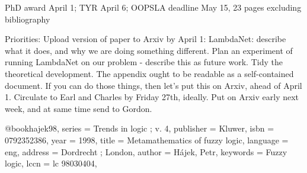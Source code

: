 PhD award April 1; TYR April 6; OOPSLA deadline May 15, 23 pages excluding bibliography


Priorities:
Upload version of paper to Arxiv by April 1:
LambdaNet: describe what it does, and why we are doing something different.
Plan an experiment of running LambdaNet on our problem - describe this as future work.
Tidy the theoretical development.  The appendix ought to be readable as a self-contained document.
If you can do those things, then let's put this on Arxiv, ahead of April 1.
Circulate to Earl and Charles by Friday 27th, ideally.  Put on Arxiv early next week, and at same time send to Gordon.

@book{hajek98,
series = {Trends in logic ; v. 4},
publisher = {Kluwer},
isbn = {0792352386},
year = {1998},
title = {Metamathematics of fuzzy logic},
language = {eng},
address = {Dordrecht ; London},
author = {H{\'a}jek, Petr},
keywords = {Fuzzy logic},
lccn = {lc 98030404},
}
